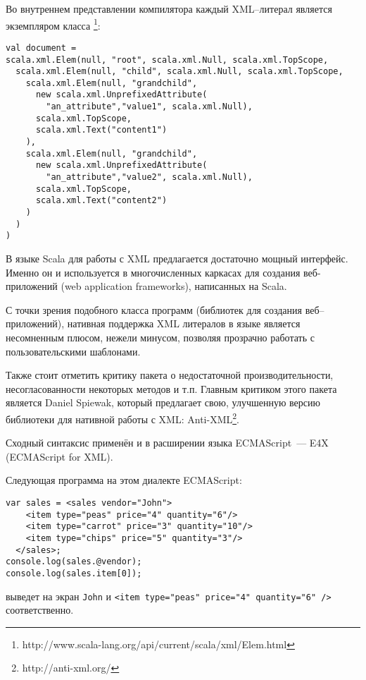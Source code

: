 \begin{code}
Во внутреннем представлении компилятора каждый XML--литерал является экземпляром класса \footnote{http://www.scala-lang.org/api/current/scala/xml/Elem.html}:

\begin{lstlisting}[caption={Внутреннее представление XML литералов из примера~\ref{scala-xml-example}.}, label={scala-xml-example-internal}]
val document =
scala.xml.Elem(null, "root", scala.xml.Null, scala.xml.TopScope,
  scala.xml.Elem(null, "child", scala.xml.Null, scala.xml.TopScope,
    scala.xml.Elem(null, "grandchild",
      new scala.xml.UnprefixedAttribute(
        "an_attribute","value1", scala.xml.Null),
      scala.xml.TopScope,
      scala.xml.Text("content1")
    ),
    scala.xml.Elem(null, "grandchild",
      new scala.xml.UnprefixedAttribute(
        "an_attribute","value2", scala.xml.Null),
      scala.xml.TopScope,
      scala.xml.Text("content2")
    )
  )
)
\end{lstlisting}\end{code}

В языке Scala для работы с XML предлагается достаточно мощный интерфейс. Именно он и используется в многочисленных каркасах для создания веб-приложений (web application frameworks), написанных на Scala.

С точки зрения подобного класса программ (библиотек для создания веб--приложений), нативная поддержка XML
литералов в языке является несомненным плюсом, нежели минусом, позволяя прозрачно работать с пользовательскими шаблонами.

Также стоит отметить критику пакета  о недостаточной производительности, несогласованности некоторых методов и т.п.
Главным критиком этого пакета является Daniel Spiewak, который предлагает свою, улучшенную версию библиотеки для нативной работы с XML: Anti-XML\footnote{http://anti-xml.org/}.

Сходный синтаксис применён и в расширении языка ECMAScript~--- E4X~\cite{E4X} (ECMAScript for XML).

\begin{code}
Следующая программа на этом диалекте ECMAScript:

\begin{lstlisting}[caption={Пример использования XML литеров в языке ECMAScript for XML.}, label=e4x-xml-example]
var sales = <sales vendor="John">
    <item type="peas" price="4" quantity="6"/>
    <item type="carrot" price="3" quantity="10"/>
    <item type="chips" price="5" quantity="3"/>
  </sales>;
console.log(sales.@vendor);
console.log(sales.item[0]);
\end{lstlisting}
выведет на экран \texttt{John} и \texttt{<item type="peas"\ price="4"\ quantity="6"\ />} соответственно.
\end{code}

